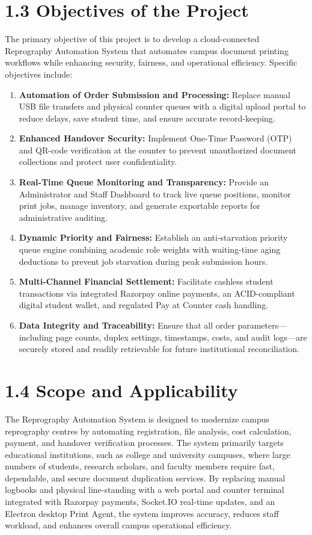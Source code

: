 \documentclass[12pt,a4paper]{report}
\begin{document}
\section{1.3 Objectives of the Project}
The primary objective of this project is to develop a cloud-connected Reprography Automation System that automates campus document printing workflows while enhancing security, fairness, and operational efficiency. Specific objectives include:
\begin{enumerate}[leftmargin=0.35in, itemsep=3pt]
  \item \textbf{Automation of Order Submission and Processing:} Replace manual USB file transfers and physical counter queues with a digital upload portal to reduce delays, save student time, and ensure accurate record-keeping.
  \item \textbf{Enhanced Handover Security:} Implement One-Time Password (OTP) and QR-code verification at the counter to prevent unauthorized document collections and protect user confidentiality.
  \item \textbf{Real-Time Queue Monitoring and Transparency:} Provide an Administrator and Staff Dashboard to track live queue positions, monitor print jobs, manage inventory, and generate exportable reports for administrative auditing.
  \item \textbf{Dynamic Priority and Fairness:} Establish an anti-starvation priority queue engine combining academic role weights with waiting-time aging deductions to prevent job starvation during peak submission hours.
  \item \textbf{Multi-Channel Financial Settlement:} Facilitate cashless student transactions via integrated Razorpay online payments, an ACID-compliant digital student wallet, and regulated Pay at Counter cash handling.
  \item \textbf{Data Integrity and Traceability:} Ensure that all order parameters---including page counts, duplex settings, timestamps, costs, and audit logs---are securely stored and readily retrievable for future institutional reconciliation.
\end{enumerate}

\section{1.4 Scope and Applicability}
The Reprography Automation System is designed to modernize campus reprography centres by automating registration, file analysis, cost calculation, payment, and handover verification processes. The system primarily targets educational institutions, such as college and university campuses, where large numbers of students, research scholars, and faculty members require fast, dependable, and secure document duplication services. By replacing manual logbooks and physical line-standing with a web portal and counter terminal integrated with Razorpay payments, Socket.IO real-time updates, and an Electron desktop Print Agent, the system improves accuracy, reduces staff workload, and enhances overall campus operational efficiency.
\end{document}
